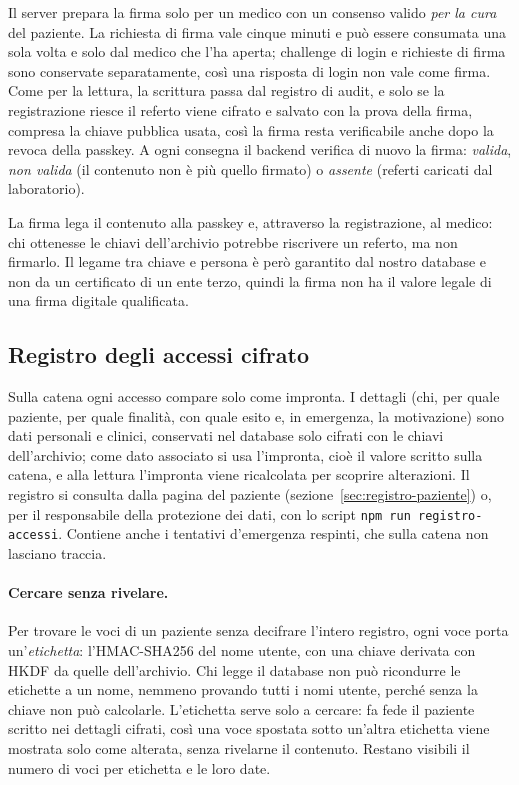 Il server prepara la firma solo per un medico con un consenso valido \emph{per la cura} del paziente. La richiesta di firma vale cinque minuti e può essere consumata una sola volta e solo dal medico che l'ha aperta; challenge di login e richieste di firma sono conservate separatamente, così una risposta di login non vale come firma. Come per la lettura, la scrittura passa dal registro di audit, e solo se la registrazione riesce il referto viene cifrato e salvato con la prova della firma, compresa la chiave pubblica usata, così la firma resta verificabile anche dopo la revoca della passkey. A ogni consegna il backend verifica di nuovo la firma: \emph{valida}, \emph{non valida} (il contenuto non è più quello firmato) o \emph{assente} (referti caricati dal laboratorio).

La firma lega il contenuto alla passkey e, attraverso la registrazione, al medico: chi ottenesse le chiavi dell'archivio potrebbe riscrivere un referto, ma non firmarlo. Il legame tra chiave e persona è però garantito dal nostro database e non da un certificato di un ente terzo, quindi la firma non ha il valore legale di una firma digitale qualificata.

\subsection{Registro degli accessi cifrato}
Sulla catena ogni accesso compare solo come impronta. I dettagli (chi, per quale paziente, per quale finalità, con quale esito e, in emergenza, la motivazione) sono dati personali e clinici, conservati nel database solo cifrati con le chiavi dell'archivio; come dato associato si usa l'impronta, cioè il valore scritto sulla catena, e alla lettura l'impronta viene ricalcolata per scoprire alterazioni. Il registro si consulta dalla pagina del paziente (sezione~\ref{sec:registro-paziente}) o, per il responsabile della protezione dei dati, con lo script \texttt{npm run registro-accessi}. Contiene anche i tentativi d'emergenza respinti, che sulla catena non lasciano traccia.

\paragraph{Cercare senza rivelare.} Per trovare le voci di un paziente senza decifrare l'intero registro, ogni voce porta un'\emph{etichetta}: l'HMAC-SHA256 del nome utente, con una chiave derivata con HKDF da quelle dell'archivio. Chi legge il database non può ricondurre le etichette a un nome, nemmeno provando tutti i nomi utente, perché senza la chiave non può calcolarle. L'etichetta serve solo a cercare: fa fede il paziente scritto nei dettagli cifrati, così una voce spostata sotto un'altra etichetta viene mostrata solo come alterata, senza rivelarne il contenuto. Restano visibili il numero di voci per etichetta e le loro date.

